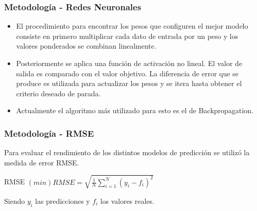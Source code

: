 \documentclass{beamer}
\begin{document}
\begin{frame}[t]
\frametitle{ Metodología - Redes Neuronales }
\vfill
\begin{itemize}
\item
El procedimiento para encontrar los pesos que configuren el mejor modelo consiste en primero multiplicar cada dato de entrada por un peso y los valores ponderados se combinan linealmente. 
\item
Posteriormente se aplica una función de activación no lineal. El valor de salida es comparado con el valor objetivo. La diferencia de error que se produce es utilizada para actualizar los pesos y se itera hasta obtener el criterio deseado de parada. 
\item
Actualmente el algoritmo más utilizado para esto es el de Backpropagation. 
\end{itemize}
\vfill
\end{frame}

\begin{frame}[t]
\frametitle{ Metodología - RMSE}
\vfill

Para evaluar el rendimiento de los distintos modelos de predicción se utilizó la medida de error RMSE.

\begin{block}{RMSE}
$(min)RMSE=\sqrt{\frac{1}{N} \sum_{i=1}^{N}\left(y_{i}-f_{i}\right)^{2}}$
\end{block}

Siendo $y_i$ las predicciones y $f_i$ los valores reales. 
\vfill
\end{frame}
\end{document}
